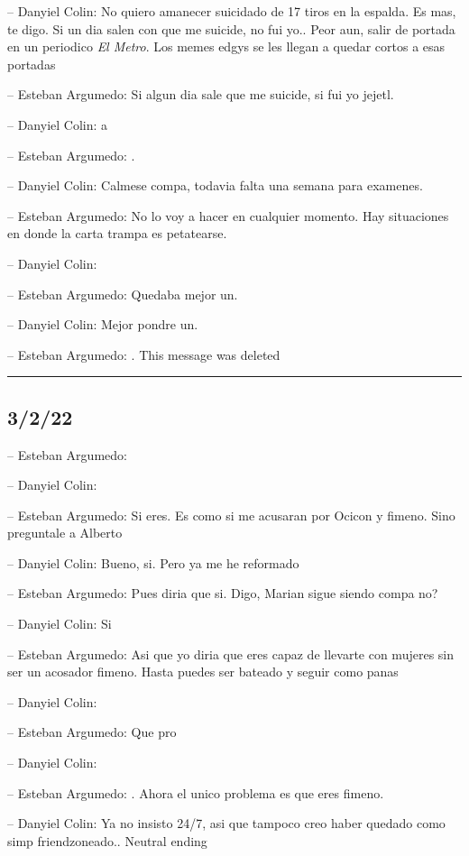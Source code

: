 -- Danyiel Colin: No quiero amanecer suicidado de 17 tiros en la
espalda. Es mas, te digo. Si un dia salen con que me suicide, no fui
yo.. Peor aun, salir de portada en un periodico \emph{El Metro}. Los
memes edgys se les llegan a quedar cortos a esas portadas

-- Esteban Argumedo: Si algun dia sale que me suicide, si fui yo jejetl.

-- Danyiel Colin: a

-- Esteban Argumedo: .

-- Danyiel Colin: Calmese compa, todavia falta una semana para examenes.

-- Esteban Argumedo: No lo voy a hacer en cualquier momento. Hay
situaciones en donde la carta trampa es petatearse.

-- Danyiel Colin:

-- Esteban Argumedo: Quedaba mejor un.

-- Danyiel Colin: Mejor pondre un.

-- Esteban Argumedo: . This message was deleted

\begin{center}\rule{0.5\linewidth}{0.5pt}\end{center}

\hypertarget{section-22}{%
\subsection{3/2/22}\label{section-22}}

-- Esteban Argumedo:

-- Danyiel Colin:

-- Esteban Argumedo: Si eres. Es como si me acusaran por Ocicon y
fimeno. Sino preguntale a Alberto

-- Danyiel Colin: Bueno, si. Pero ya me he reformado

-- Esteban Argumedo: Pues diria que si. Digo, Marian sigue siendo compa
no?

-- Danyiel Colin: Si

-- Esteban Argumedo: Asi que yo diria que eres capaz de llevarte con
mujeres sin ser un acosador fimeno. Hasta puedes ser bateado y seguir
como panas

-- Danyiel Colin:

-- Esteban Argumedo: Que pro

-- Danyiel Colin:

-- Esteban Argumedo: . Ahora el unico problema es que eres fimeno.

-- Danyiel Colin: Ya no insisto 24/7, asi que tampoco creo haber quedado
como simp friendzoneado.. Neutral ending

